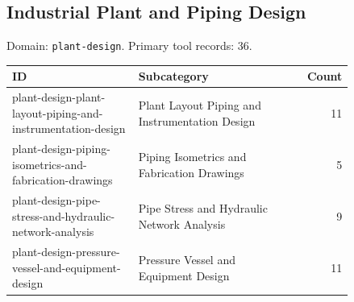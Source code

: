\subsection{Industrial Plant and Piping Design}
\noindent Domain: \texttt{plant-design}. Primary tool records: 36.
\begin{longtable}{p{0.37\linewidth}p{0.47\linewidth}r}
ID & Subcategory & Count\\\hline\endhead
plant-design-plant-layout-piping-and-instrumentation-design & Plant Layout Piping and Instrumentation Design & 11\\
plant-design-piping-isometrics-and-fabrication-drawings & Piping Isometrics and Fabrication Drawings & 5\\
plant-design-pipe-stress-and-hydraulic-network-analysis & Pipe Stress and Hydraulic Network Analysis & 9\\
plant-design-pressure-vessel-and-equipment-design & Pressure Vessel and Equipment Design & 11\\
\end{longtable}

